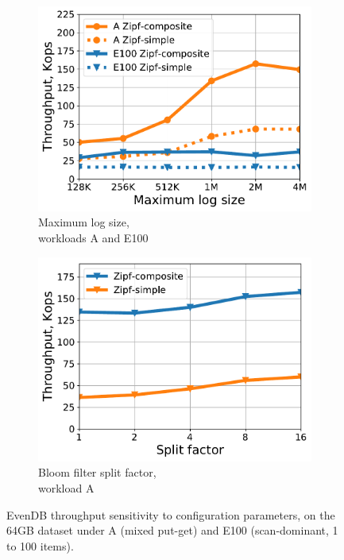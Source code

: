 \documentclass[sigplan,10pt]{acmart}
\newcommand{\sys}{EvenDB}
\begin{document}
\begin{figure}[htb]
\centering
\begin{subfigure}{0.49\linewidth}
\includegraphics[width=\textwidth]{figs/max_log_size_line.pdf}
\caption{Maximum log size,\\  workloads A and E100}
\label{fig:params:log}
\end{subfigure}
\begin{subfigure}{0.49\linewidth}
\includegraphics[width=\textwidth]{figs/Bloom_filter_line.pdf}
\caption{Bloom filter split factor,\\ workload A}
\label{fig:params:bf}
\end{subfigure}
\caption{{\sys\/ throughput sensitivity to configuration parameters, on the 64GB dataset under  A (mixed put-get) and 
E100 (scan-dominant, 1 to 100 items).}}
\label{fig:params}
\end{figure}
\end{document}
